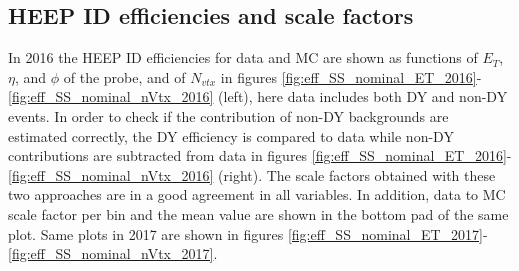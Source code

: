 \subsection{HEEP ID efficiencies and scale factors}
\label{subsubsec:SF_results}
In 2016 the HEEP ID efficiencies for data and MC are shown as functions of $E_T$, $\eta$, and $\phi$ of the probe, and of $N_{vtx}$ in figures \ref{fig:eff_SS_nominal_ET_2016}-\ref{fig:eff_SS_nominal_nVtx_2016} (left), here data includes both DY and non-DY events. In order to check if the contribution of non-DY backgrounds are estimated correctly, the DY efficiency is compared to data while non-DY contributions are subtracted from data in figures \ref{fig:eff_SS_nominal_ET_2016}-\ref{fig:eff_SS_nominal_nVtx_2016} (right). The scale factors obtained with these two approaches are in a good agreement in all variables. In addition, data to MC scale factor per bin and the mean value are shown in the bottom pad of the same plot.
Same plots in 2017 are shown in figures \ref{fig:eff_SS_nominal_ET_2017}-\ref{fig:eff_SS_nominal_nVtx_2017}.
